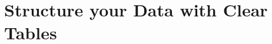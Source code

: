 \documentclass[aspectratio=169]{beamer}
\begin{document}



%             



\section{\textbf{Structure} your \textbf{Data} with Clear \textbf{Tables}}

\begin{frame}
\end{frame}
\end{document}
